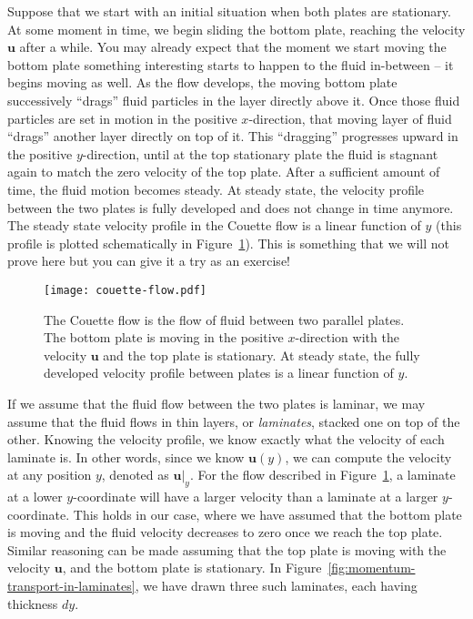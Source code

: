 \documentclass[10pt,twocolumn]{article}
\begin{document}
Suppose that we start with an initial situation when both plates are stationary. At some moment in time, we begin sliding the bottom plate, reaching the velocity $\mathbf{u}$ after a while. You may already expect that the moment we start moving the bottom plate something interesting starts to happen to the fluid in-between -- it begins moving as well. As the flow develops, the moving bottom plate successively ``drags'' fluid particles in the layer directly above it. Once those fluid particles are set in motion in the positive $x$-direction, that moving layer of fluid ``drags'' another layer directly on top of it. This ``dragging'' progresses upward in the positive $y$-direction, until at the top stationary plate the fluid is stagnant again to match the zero velocity of the top plate. 
After a sufficient amount of time, the fluid motion becomes steady. At steady state, the velocity profile between the two plates is fully developed and does not change in time anymore. The steady state velocity profile in the Couette flow is a linear function of $y$ (this profile is plotted schematically in Figure~\ref{fig:couette-flow}). This is something that we will not prove here but you can give it a try as an exercise!
\begin{figure}[t!]
\centering\texttt{[image: couette-flow.pdf]}
\caption{The Couette flow is the flow of fluid between two parallel plates. The bottom plate is moving in the positive $x$-direction with the velocity $\mathbf{u}$ and the top plate is stationary. At steady state, the fully developed velocity profile between plates is a linear function of $y$.}
\label{fig:couette-flow}
\end{figure}

If we assume that the fluid flow between the two plates is laminar, we may assume that the fluid flows in thin layers, or \textit{laminates}, stacked one on top of the other. Knowing the velocity profile, we know exactly what the velocity of each laminate is. In other words, since we know $\mathbf{u}(y)$, we can compute the velocity at any position $y$, denoted as $\mathbf{u}|_{y}$. For the flow described in Figure~\ref{fig:couette-flow}, a laminate at a lower $y$-coordinate will have a larger velocity than a laminate at a larger $y$-coordinate. This holds in our case, where we have assumed that the bottom plate is moving and the fluid velocity decreases to zero once we reach the top plate. Similar reasoning can be made assuming that the top plate is moving with the velocity $\mathbf{u}$, and the bottom plate is stationary. In Figure~\ref{fig:momentum-transport-in-laminates}, we have drawn three such laminates, each having thickness $dy$.
\end{document}
